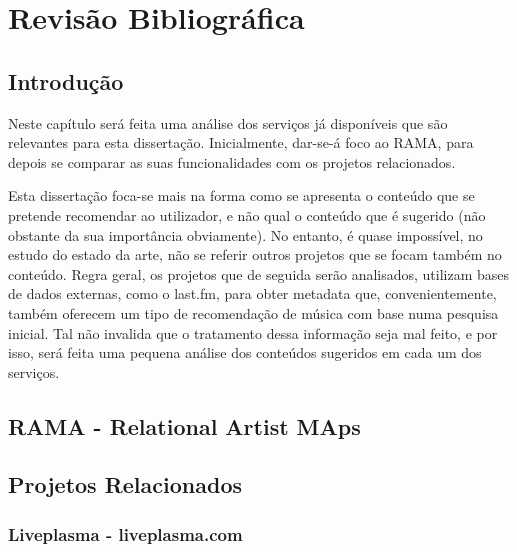 
\chapter{Revisão Bibliográfica} \label{chap:chap2}

\section*{}

\section{Introdução}

Neste capítulo será feita uma análise dos serviços já disponíveis que são relevantes para esta dissertação.
Inicialmente, dar-se-á foco ao RAMA, para depois se comparar as suas funcionalidades com os projetos relacionados.

Esta dissertação foca-se mais na forma como se apresenta o conteúdo que se pretende recomendar ao utilizador, e não qual o conteúdo que é sugerido (não obstante da sua importância obviamente).
No entanto, é quase impossível, no estudo do estado da arte, não se referir outros projetos que se focam também no conteúdo.
Regra geral, os projetos que de seguida serão analisados, utilizam bases de dados externas, como o last.fm, para obter metadata que, convenientemente, também oferecem um tipo de recomendação de música com base numa pesquisa inicial.
Tal não invalida que o tratamento dessa informação seja mal feito, e por isso, será feita uma pequena análise dos conteúdos sugeridos em cada um dos serviços.

\section{RAMA - Relational Artist MAps} %
\label{sec:rama}


\section{Projetos Relacionados} %
\label{sec:projetos_relacionados}


\subsection{Liveplasma - liveplasma.com} %
\label{sub:liveplasma}

